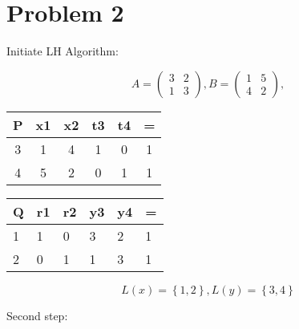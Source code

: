 \documentclass{article}
\newenvironment{answer}{\par\color{ForestGreen}}{\par}
\begin{document}
\section{Problem 2}
\begin{answer}
    Initiate LH Algorithm:

    $$A = \begin{pmatrix}
          3 & 2 \\
          1 & 3
        \end{pmatrix},
    B = \begin{pmatrix}
          1 & 5 \\
          4 & 2
        \end{pmatrix},$$
\begin{table}[!htb]
  \begin{answer}
\begin{minipage}[t]{.5\textwidth}
\centering
    \begin{tabular}[t]{cccccc}
      \toprule
      P & x1 & x2 & t3 & t4 & = \\
      \midrule
      3 & 1 & 4 & 1 & 0 & 1 \\
      \hline
      4 & 5 & 2 & 0 & 1 & 1 \\
      \bottomrule
    \end{tabular}
\end{minipage}
\begin{minipage}[t]{0.5\textwidth}
\centering
    \begin{tabular}[t]{llllll}
      \toprule
      Q & r1 & r2 & y3 & y4 & = \\
      \midrule
      1 & 1 & 0 & 3 & 2 & 1 \\
      \hline
      2 & 0 & 1 & 1 & 3 & 1 \\
      \bottomrule
    \end{tabular}
\end{minipage}
\end{answer}
\end{table}
$$L(x)=\left\{1,2\right\}, L(y)=\left\{3,4\right\}$$

Second step:


\end{answer}
\end{document}
